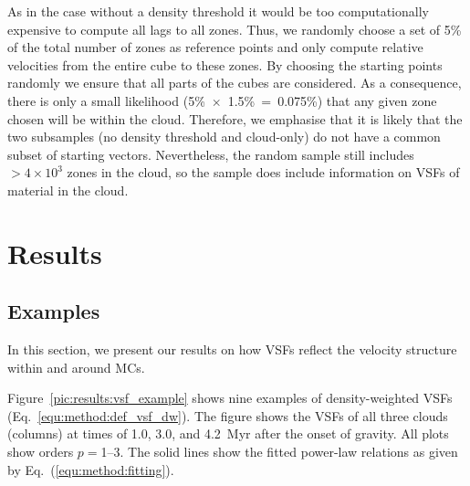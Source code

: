 \documentclass{aa}		%
\begin{document}
As in the case without a density threshold it would be too computationally expensive to compute all lags to all zones.
Thus, we randomly choose a set of 5\% of the total number of zones as reference points and only compute relative velocities from the entire cube to these zones.
By choosing the starting points randomly we ensure that all parts of the cubes are considered. 
As a consequence, there is only a small likelihood (5\%~$\times$~1.5\%~=~0.075\%) that any given zone chosen will be within the cloud.
Therefore, we emphasise that it is likely that the two subsamples (no density threshold and cloud-only) do not have a common subset of starting vectors.
Nevertheless, the random sample still includes $>4 \times 10^3$ zones in the cloud, so the sample does include information on VSFs of material in the cloud.



\section{Results}\label{results}

\subsection{Examples}\label{results:example}

In this section, we present our results on how VSFs reflect the velocity structure within and around MCs.

Figure~\ref{pic:results:vsf_example} shows nine examples of density-weighted VSFs (Eq.~\ref{equ:method:def_vsf_dw}).
The figure shows the VSFs of all three clouds (columns) at times of 1.0, 3.0, and 4.2~Myr after the onset of gravity. 
All plots show orders $p=$1--3.
The solid lines show the fitted power-law relations as given by Eq.~(\ref{equ:method:fitting}).
\end{document}
